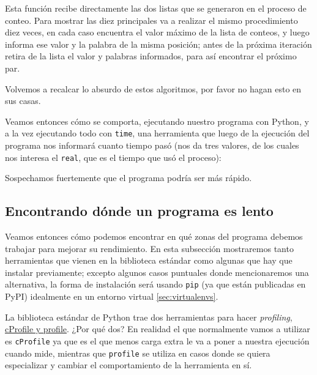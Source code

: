 
Esta función recibe directamente las dos listas que se generaron en el proceso de conteo. Para mostrar las diez principales va a realizar el mismo procedimiento diez veces, en cada caso encuentra el valor máximo de la lista de conteos, y luego informa ese valor y la palabra de la misma posición; antes de la próxima iteración retira de la lista el valor y palabras informados, para así encontrar el próximo par.

Volvemos a recalcar lo absurdo de estos algoritmos, por favor no hagan esto en sus casas. 

Veamos entonces cómo se comporta, ejecutando nuestro programa con Python, y a la vez ejecutando todo con \texttt{time}, una herramienta que luego de la ejecución del programa nos informará cuanto tiempo pasó (nos da tres valores, de los cuales nos interesa el \texttt{real}, que es el tiempo que usó el proceso):


Sospechamos fuertemente que el programa podría ser más rápido.


\subsection{Encontrando dónde un programa es lento}

Veamos entonces cómo podemos encontrar en qué zonas del programa debemos trabajar para mejorar su rendimiento. En esta subsección mostraremos tanto herramientas que vienen en la biblioteca estándar como algunas que hay que instalar previamente; excepto algunos casos puntuales donde mencionaremos una alternativa, la forma de instalación será usando \texttt{pip} (ya que están publicadas en PyPI) idealmente en un entorno virtual \ref{sec:virtualenvs}.

La biblioteca estándar de Python trae dos herramientas para hacer \textit{profiling}, \href{https://docs.python.org/es/dev/library/profile.html#the-python-profilers}{cProfile y profile}. ¿Por qué dos? En realidad el que normalmente vamos a utilizar es \texttt{cProfile} ya que es el que menos carga extra le va a poner a nuestra ejecución cuando mide, mientras que \texttt{profile} se utiliza en casos donde se quiera especializar y cambiar el comportamiento de la herramienta en sí.

